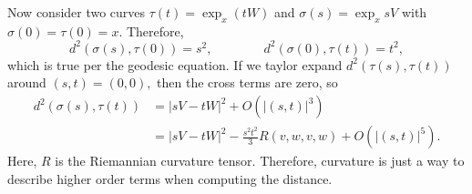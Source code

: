 \documentclass{article}
\numberwithin{equation}{section}
\begin{document}
Now consider two curves $\tau(t) = \exp_x(tW)$ and $\sigma(s) = \exp_xsV$ with $\sigma(0) = \tau(0) = x.$ Therefore,
\begin{equation*}
    d^2(\sigma(s),\tau(0)) = s^2,\quad\quad\quad\quad d^2(\sigma(0),\tau(t)) = t^2,
\end{equation*}
which is true per the geodesic equation. If we taylor expand $d^2(\tau(s),\tau(t))$ around $(s,t)=(0,0),$ then the cross terms are zero, so 
\begin{align*}
    d^2(\sigma(s),\tau(t)) &= |sV-tW|^2 + O(|(s,t
    )|^3) \\ 
    &= |sV-tW|^2 - \frac{s^2t^2}{3}R(v,w,v,w) + O(|(s,t)|^5).
\end{align*}
Here, $R$ is the Riemannian curvature tensor. Therefore, curvature is just a way to describe higher order terms when computing the distance.
\end{document}
